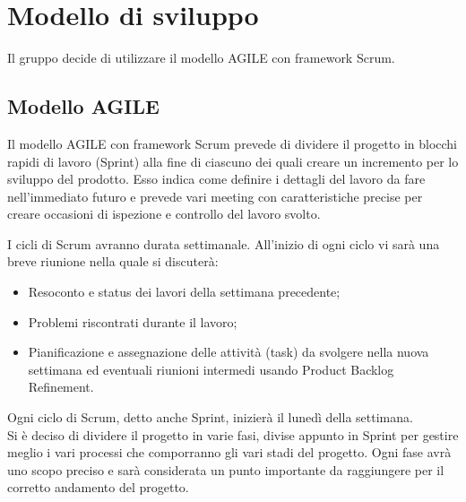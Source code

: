 \section{Modello di sviluppo}
Il gruppo decide di utilizzare il modello AGILE con framework Scrum.

\subsection{Modello AGILE}
Il modello AGILE con framework Scrum prevede di dividere il progetto in blocchi rapidi di lavoro (Sprint) 
alla fine di ciascuno dei quali creare un incremento per lo sviluppo del prodotto. 
Esso indica come definire i dettagli del lavoro da fare nell'immediato futuro e prevede 
vari meeting con caratteristiche precise per creare occasioni di ispezione e controllo del lavoro svolto.

I cicli di Scrum avranno durata settimanale. All'inizio di ogni ciclo vi sarà una breve riunione nella quale si discuterà:
\begin{itemize}
	\item Resoconto e status dei lavori della settimana precedente;
	\item Problemi riscontrati durante il lavoro;
	\item Pianificazione e assegnazione delle attività (task) da svolgere nella nuova settimana ed eventuali riunioni intermedi usando Product Backlog Refinement.
\end{itemize}
Ogni ciclo di Scrum, detto anche Sprint, inizierà il lunedì della settimana.\\
Si è deciso di dividere il progetto in varie fasi, divise appunto in Sprint per gestire meglio i vari processi che comporranno gli vari stadi del progetto. Ogni fase avrà uno scopo preciso e sarà considerata un punto importante da raggiungere per il corretto andamento del progetto.